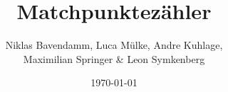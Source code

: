 \subject{Dokumentation}
\title{Matchpunktezähler}
\author{Niklas Bavendamm, Luca Mülke, Andre Kuhlage,\\
 Maximilian Springer \& Leon Symkenberg}
\date{\today}

\maketitle